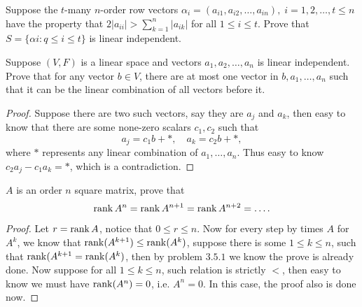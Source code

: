 \begin{pro}%
	Suppose the $t$-many $n$-order row vectors $\alpha_i=(a_{i1},a_{i2},\dots,a_{in}),\;i=1,2,\dots,t\leq n$ have the property that $2|a_{ii}|>\sum_{k=1}^n |a_{ik}|$ for all $1\leq i\leq t$. Prove that $S=\{\alpha i:q\leq i\leq t\}$ is linear independent.
\end{pro}

\begin{pro}%
	Suppose $(V,F)$ is a linear space and vectors $a_1,a_2,\dots,a_n$ is linear independent. Prove that for any vector $b\in V$, there are at most one vector in $b,a_1,\dots,a_n$ such that it can be the linear combination of all vectors before it.
\end{pro}
\begin{proof}
	Suppose there are two such vectors, say they are $a_j$ and $a_k$, then easy to know that there are some none-zero scalars $c_1,c_2$ such that
	\[a_j=c_1b+*,\quad a_k=c_2b+*,\]
	where $*$ represents any linear combination of $a_1,\dots,a_n$. Thus easy to know $c_2 a_j-c_1 a_k=*$, which is a contradiction.
\end{proof}

\begin{pro}%
	$A$ is an order $n$ square matrix, prove that
	\[\operatorname*{rank} A^n=\operatorname*{rank} A^{n+1}=\operatorname*{rank} A^{n+2}=\dots.\]
\end{pro}
\begin{proof}
	Let $r=\operatorname*{rank} A$, notice that $0\leq r\leq n$. Now for every step by times $A$ for $A^k$, we know that $\operatorname*{rank}(A^{k+1})\leq \operatorname*{rank}(A^k)$, suppose there is some $1\leq k\leq n$, such that $\operatorname*{rank}(A^{k+1}=\operatorname*{rank}(A^k)$, then by problem $3.5.1$ we know the prove is already done. Now suppose for all $1\leq k\leq n$, such relation is strictly $<$, then easy to know we must have $\operatorname*{rank}(A^n)=0$, i.e. $A^n=0$. In this case, the proof also is done now.
\end{proof}

